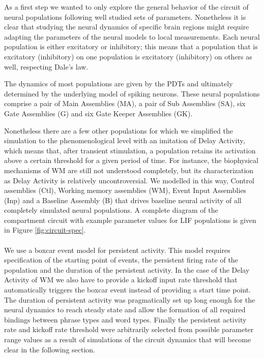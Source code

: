 \documentclass[10pt]{article}
\begin{document}
As a first step we wanted to only explore the general behavior of the circuit of neural populations following well studied sets of parameters.
Nonetheless it is clear that studying the neural dynamics of specific brain regions might require adapting the parameters of the neural models to local measurements.
Each neural population is either excitatory or inhibitory; this means that a population that is excitatory (inhibitory) on one population is excitatory (inhibitory) on others as well, respecting Dale's law.

The dynamics of most populations are given by the PDTs and ultimately determined by the underlying model of spiking neurons.
These neural populations comprise a pair of Main Assemblies (MA), a pair of Sub Assemblies (SA), six Gate Assemblies (G) and six Gate Keeper Assemblies (GK).

Nonetheless there are a few other populations for which we simplified the simulation to the phenomenological level with an imitation of Delay Activity, which means that, after transient stimulation, a population retains its activation above a certain threshold for a given period of time.
For instance, the biophysical mechanisms of WM are still not understood completely, but its characterization as Delay Activity is relatively uncontroversial.
We modelled in this way, Control assemblies (Ctl), Working memory assemblies (WM), Event Input Assemblies (Inp) and a Baseline Assembly (B) that drives baseline neural activity of all completely simulated neural populations.
A complete diagram of the compartment circuit with example parameter values for LIF populations is given in Figure \ref{fig:circuit-spec}.\\~\\

We use a boxcar event model for persistent activity.
This model requires specification of the starting point of events, the persistent firing rate of the population and the duration of the persistent activity.
In the case of the Delay Activity of WM we also have to provide a kickoff input rate threshold that automatically triggers the boxcar event instead of providing a start time point.
The duration of persistent activity was pragmatically set up long enough for the neural dynamics to reach steady state and allow the formation of  all required bindings between phrase types and 
word types.
Finally the persistent activity rate and kickoff rate threshold were arbitrarily selected from possible parameter range values as a result of simulations of the circuit dynamics that will become clear in the following section.
\end{document}
